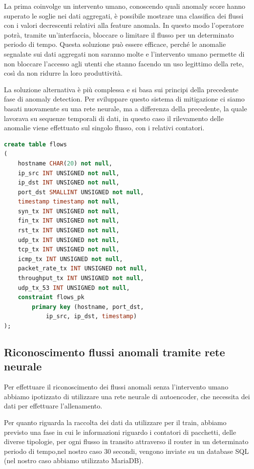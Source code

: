 La prima coinvolge un intervento umano, conoscendo quali anomaly score hanno superato le soglie nei dati aggregati, è possibile mostrare una classifica dei flussi con i valori decrescenti relativi alla feature anomala. In questo modo l'operatore potrà, tramite un'interfaccia, bloccare o limitare il flusso per un determinato periodo di tempo. Questa soluzione può essere efficace, perché le anomalie segnalate sui dati aggregati non saranno molte e l'intervento umano permette di non bloccare l'accesso agli utenti che stanno facendo un uso legittimo della rete, così da non ridurre la loro produttività.

La soluzione alternativa è più complessa e si basa sui principi della precedente fase di anomaly detection.
Per sviluppare questo sistema di mitigazione ci siamo basati nuovamente su una rete neurale, ma a differenza della precedente, la quale lavorava su sequenze temporali di dati, in questo caso il rilevamento delle anomalie viene effettuato sul singolo flusso, con i relativi contatori.

\begin{lstlisting}[language=SQL,caption={Esempio di tabella nel database SQL.}]
create table flows
(
    hostname CHAR(20) not null,
    ip_src INT UNSIGNED not null,
    ip_dst INT UNSIGNED not null,
    port_dst SMALLINT UNSIGNED not null,
    timestamp timestamp not null,
    syn_tx INT UNSIGNED not null,
    fin_tx INT UNSIGNED not null,
    rst_tx INT UNSIGNED not null,
    udp_tx INT UNSIGNED not null,
    tcp_tx INT UNSIGNED not null,
    icmp_tx INT UNSIGNED not null,
    packet_rate_tx INT UNSIGNED not null,
    throughput_tx INT UNSIGNED not null,
    udp_tx_53 INT UNSIGNED not null,
    constraint flows_pk
        primary key (hostname, port_dst,
            ip_src, ip_dst, timestamp)
);
\end{lstlisting}

\subsection{Riconoscimento flussi anomali tramite rete neurale}

Per effettuare il riconoscimento dei flussi anomali senza l'intervento umano abbiamo ipotizzato di utilizzare una rete neurale di autoencoder, che necessita dei dati per effettuare l'allenamento.

Per quanto riguarda la raccolta dei dati da utilizzare per il train, abbiamo previsto una fase in cui le informazioni riguardo i contatori di pacchetti, delle diverse tipologie, per ogni flusso in transito attraverso il router in un determinato periodo di tempo,nel nostro caso 30 secondi, vengono inviate su un database SQL (nel nostro caso abbiamo utilizzato MariaDB).

